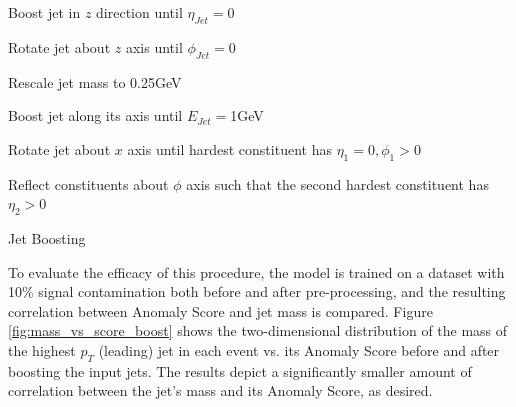\documentclass[12pt, a4paper]{article}
\begin{document}
\begin{algorithm}[H]
\SetAlgoLined
{}
  \Beginning{}

  Boost jet in $z$ direction until $\eta_{Jet} = 0$
 
  Rotate jet about $z$ axis until $\phi_{Jet} = 0$
 
  Rescale jet mass to 0.25GeV
 
  Boost jet along its axis until $E_{Jet} = $1GeV
 
  Rotate jet about $x$ axis until hardest constituent has $\eta_{1} = 0, \phi_{1} > 0$
 
 

 
Reflect constituents about $\phi$ axis such that the second hardest constituent has $\eta_{2} > 0$
 
\caption{Jet Boosting}
\label{alg:boost}
\end{algorithm}





To evaluate the efficacy of this procedure, the model is trained on a dataset with 10\% signal contamination both before and after pre-processing, and the resulting correlation between Anomaly Score and jet mass is compared. Figure \ref{fig:mass_vs_score_boost} shows the two-dimensional distribution of the mass of the highest $p_T$ (leading) jet in each event vs. its Anomaly Score before and after boosting the input jets. The results depict a significantly smaller amount of correlation between the jet's mass and its Anomaly Score, as desired.
\end{document}

